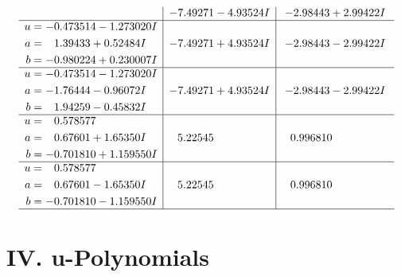 \documentclass[1p]{elsarticle_modified}
\theoremstyle{definition}
\begin{document}
$$\begin{array}{c|c|c}
 & -7.49271 - 4.93524 I & -2.98443 + 2.99422 I \\ \hline\begin{aligned}
u &= -0.473514 - 1.273020 I \\
a &= \phantom{-}1.39433 + 0.52484 I \\
b &= -0.980224 + 0.230007 I\end{aligned}
 & -7.49271 + 4.93524 I & -2.98443 - 2.99422 I \\ \hline\begin{aligned}
u &= -0.473514 - 1.273020 I \\
a &= -1.76444 - 0.96072 I \\
b &= \phantom{-}1.94259 - 0.45832 I\end{aligned}
 & -7.49271 + 4.93524 I & -2.98443 - 2.99422 I \\ \hline\begin{aligned}
u &= \phantom{-}0.578577\phantom{ +0.000000I} \\
a &= \phantom{-}0.67601 + 1.65350 I \\
b &= -0.701810 + 1.159550 I\end{aligned}
 & \phantom{-}5.22545\phantom{ +0.000000I} & \phantom{-}0.996810\phantom{ +0.000000I} \\ \hline\begin{aligned}
u &= \phantom{-}0.578577\phantom{ +0.000000I} \\
a &= \phantom{-}0.67601 - 1.65350 I \\
b &= -0.701810 - 1.159550 I\end{aligned}
 & \phantom{-}5.22545\phantom{ +0.000000I} & \phantom{-}0.996810\phantom{ +0.000000I}\\
 \hline 
 \end{array}$$\newpage
\newpage\renewcommand{\arraystretch}{1}
\centering \section*{ IV. u-Polynomials}
\end{document}

